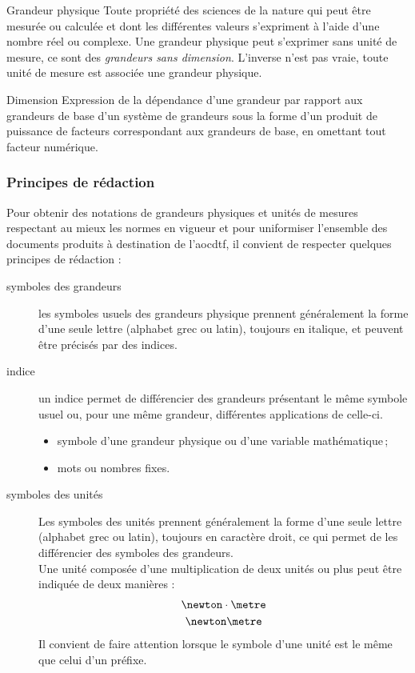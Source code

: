 \documentclass[a4paper, 11pt, twoside, fleqn]{memoir}
\begin{document}
\begin{definition}{Grandeur physique}{}
Toute propriété des sciences de la nature qui peut être mesurée ou calculée et dont les différentes valeurs s'expriment à l'aide d'une nombre réel ou complexe. Une grandeur physique peut s'exprimer sans unité de mesure, ce sont des \emph{grandeurs sans dimension}. L'inverse n'est pas vraie, toute unité de mesure est associée une grandeur physique.
\end{definition}

\begin{definition}{Dimension}{}
Expression de la dépendance d'une grandeur par rapport aux grandeurs de base d'un système de grandeurs sous la forme d'un produit de puissance de facteurs correspondant aux grandeurs de base, en omettant tout facteur numérique.
\end{definition}

			 \subsubsection{Principes de rédaction}
			 
Pour obtenir des notations de grandeurs physiques et unités de mesures respectant au mieux les normes en vigueur et pour uniformiser l'ensemble des documents produits à destination de l'\gls{aocdtf}, il convient de respecter quelques principes de rédaction :

\begin{description}
	\item[symboles des grandeurs] les symboles usuels des grandeurs physique prennent généralement la forme d'une seule lettre (alphabet grec ou latin), toujours en italique, et peuvent être précisés par des indices.
	\item [indice] un indice permet de différencier des grandeurs présentant le même symbole usuel ou, pour une même grandeur, différentes applications de celle-ci.
		\begin{itemize}
			\item symbole d'une grandeur physique ou d'une variable mathématique\,;
			\item mots ou nombres fixes.
		\end{itemize}
	\item[symboles des unités] Les symboles des unités prennent généralement la forme d'une seule lettre (alphabet grec ou latin), toujours en caractère droit, ce qui permet de les différencier des symboles des grandeurs.\\
Une unité composée d'une multiplication de deux unités ou plus peut être indiquée de deux manières :
		\begin{gather*}
			\newton\cdot\metre \\ 
			\newton\metre
		\end{gather*}
Il convient de faire attention lorsque le symbole d'une unité est le même que celui d'un préfixe.
\end{description}			 
\end{document}
